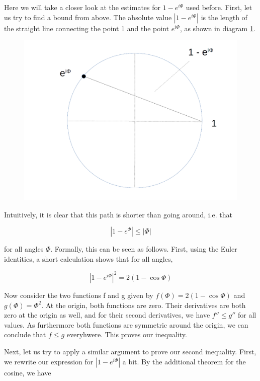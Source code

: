 \documentclass[a4paper, draft]{article}
\theoremstyle{own}
\theoremstyle{remark}
\begin{document}
Here we will take a closer look at the estimates for $1 - e^{i\Phi}$ used before. First, let us try to find a bound from above. The absolute value $| 1 - e^{i\Phi}|$ is the length of the straight line connecting the point 1 and the point $e^{i\Phi}$, as shown in diagram \ref{fig:LineSegments}.

\begin{figure}[ht]
\centering
\includegraphics[width=1.0\linewidth]{images/LineSegments}
\caption[Estimates on the unit circle]{}
\label{fig:LineSegments}
\end{figure}

Intuitively, it is clear that this path is shorter than going around, i.e. that 

$$
| 1 - e^{\Phi} | \leq |\Phi|
$$

for all angles $\Phi$. Formally, this can be seen as follows. First, using the Euler identities, a short calculation shows that for all angles,

$$
|1 - e^{i\Phi}|^2 = 2(1 - \cos \Phi)
$$

Now consider the two functions f and g given by $f(\Phi) = 2(1 - \cos \Phi)$ and $g(\Phi)  = \Phi^2$. At the origin, both functions are zero. Their derivatives are both zero at the origin as well, and for their second derivatives, we have $f'' \leq g''$ for all values. As furthermore both functions are symmetric around the origin, we can conclude that $f \leq g$ everyhwere. This proves our inequality.

Next, let us try to apply a similar argument to prove our second inequality. First, we rewrite our expression for $|1 - e^{i\Phi}|$ a bit. By the additional theorem for the cosine, we have
\end{document}
